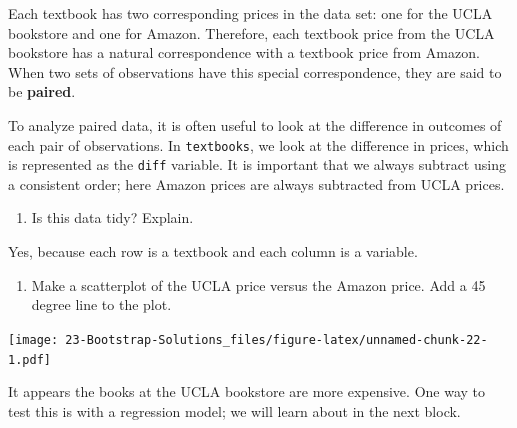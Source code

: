 \documentclass[
]{book}
\newenvironment{Shaded}{\begin{snugshade}}{\end{snugshade}}
\newcommand{\DataTypeTok}[1]{\textcolor[rgb]{0.13,0.29,0.53}{#1}}
\newcommand{\DecValTok}[1]{\textcolor[rgb]{0.00,0.00,0.81}{#1}}
\newcommand{\KeywordTok}[1]{\textcolor[rgb]{0.13,0.29,0.53}{\textbf{#1}}}
\newcommand{\NormalTok}[1]{#1}
\newcommand{\OperatorTok}[1]{\textcolor[rgb]{0.81,0.36,0.00}{\textbf{#1}}}
\newcommand{\StringTok}[1]{\textcolor[rgb]{0.31,0.60,0.02}{#1}}
\providecommand{\tightlist}{%
  \setlength{\itemsep}{0pt}\setlength{\parskip}{0pt}}
\begin{document}
Each textbook has two corresponding prices in the data set: one for the UCLA bookstore and one for Amazon. Therefore, each textbook price from the UCLA bookstore has a natural correspondence with a textbook price from Amazon. When two sets of observations have this special correspondence, they are said to be \textbf{paired}.

To analyze paired data, it is often useful to look at the difference in outcomes of each pair of observations. In \texttt{textbooks}, we look at the difference in prices, which is represented as the \texttt{diff} variable. It is important that we always subtract using a consistent order; here Amazon prices are always subtracted from UCLA prices.

\begin{enumerate}
\def\labelenumi{\alph{enumi}.}
\tightlist
\item
  Is this data tidy? Explain.
\end{enumerate}

Yes, because each row is a textbook and each column is a variable.

\begin{enumerate}
\def\labelenumi{\alph{enumi}.}
\setcounter{enumi}{1}
\tightlist
\item
  Make a scatterplot of the UCLA price versus the Amazon price. Add a 45 degree line to the plot.
\end{enumerate}

\begin{Shaded}
\end{Shaded}

\texttt{[image: 23-Bootstrap-Solutions\_files/figure-latex/unnamed-chunk-22-1.pdf]}

It appears the books at the UCLA bookstore are more expensive. One way to test this is with a regression model; we will learn about in the next block.
\end{document}

